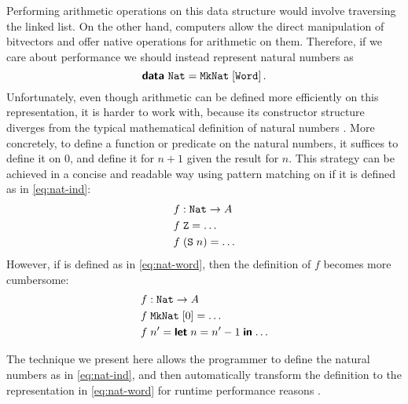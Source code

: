 Performing arithmetic operations on this data structure would involve
traversing the linked list. On the other hand, computers allow the direct
manipulation of bitvectors and offer native operations for arithmetic on them.
Therefore, if we care about performance we should instead represent natural
numbers as
\begin{equation}\label{eq:nat-word}
  \textsf{\textbf{data}}\ \texttt{Nat} = \texttt{MkNat} \; [\texttt{Word}] \,.
\end{equation} 
Unfortunately, even though arithmetic can be defined more efficiently on this
representation, it is harder to work with, because its constructor structure
diverges from the typical mathematical definition of natural numbers . More
concretely, to define a function or predicate on the natural numbers, it
suffices to define it on 0, and define it for $n + 1$ given the result for $n$.
This strategy can be achieved in a concise and readable way using pattern
matching on  if it is defined as in \eqref{eq:nat-ind}:
\begin{align*}
   & f : \texttt{Nat} \to A        \\
   & f\; \texttt{Z} = \ldots       \\
   & f\; (\texttt{S}\; n) = \ldots
\end{align*}
However, if  is defined as in \eqref{eq:nat-word}, then the
definition of $f$ becomes more cumbersome:
\begin{align*}
   & f : \texttt{Nat} \to A              \\
   & f\; \texttt{MkNat} \; [0] = \ldots  \\
   & f\; n' = \textsf{\textbf{let}}\; {n} = {n' - 1}\; \textsf{\textbf{in}}\; {\ldots}
\end{align*} 

The technique we present here allows the programmer to define the natural
numbers as in \eqref{eq:nat-ind}, and then automatically transform the
definition to the representation in \eqref{eq:nat-word} for runtime performance
reasons .

